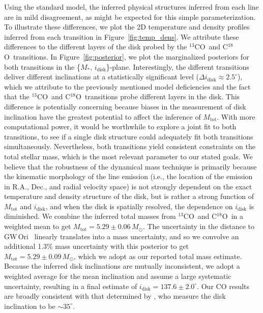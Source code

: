 \documentclass[twocolumn]{aastex61}
\newcommand{\obj}{GW\,Ori}
\newcommand{\thirteen}{${}^{13}$CO}
\newcommand{\eighteen}{C${}^{18}$O}
\begin{document}
Using the standard model, the inferred physical structures inferred from each line are in mild disagreement, as might be expected for this simple parameterization. To illustrate these differences, we plot the 2D temperature and density profiles inferred from each transition in Figure~\ref{fig:temp_dens}. We attribute these differences to the different layers of the disk probed by the \thirteen\ and \eighteen\ transitions. In Figure~\ref{fig:posterior}, we plot the marginalized posteriors for both transitions in the \{$M_\ast$, $i_\mathrm{disk}$\}-plane. Interestingly, the different transitions deliver different inclinations at a statistically significant level ($\Delta i_\mathrm{disk} \approx 2.5^\circ$), which we attribute to the previously mentioned model deficiencies and the fact that the \thirteen\ and \eighteen\ transitions probe different layers in the disk.
This difference is potentially concerning because biases in the measurement of disk inclination have the greatest potential to affect the inference of $M_\mathrm{tot}$. With more computational power, it would be worthwhile to explore a joint fit to both transitions, to see if a single disk structure could adequately fit both transitions simultaneously.
Nevertheless, both transitions yield consistent constraints on the total stellar mass, which is the most relevant parameter to our stated goals. We believe that the robustness of the dynamical mass technique is primarily because the kinematic morphology of the line emission (i.e., the location of the emission in R.A., Dec., and radial velocity space) is not strongly dependent on the exact temperature and density structure of the disk, but is rather a strong function of $M_\mathrm{tot}$ and $i_\mathrm{disk}$, and when the disk is spatially resolved, the dependence on $i_\mathrm{disk}$ is diminished. We combine the inferred total masses from \thirteen\ and \eighteen\ in a weighted mean to get $M_\mathrm{tot} = 5.29 \pm 0.06\,M_\odot$.
The uncertainty in the distance to \obj\ \citep[$388 \pm 5\,$pc;][]{kounkel17} linearly translates into a mass uncertainty, and so we convolve an additional 1.3\% mass uncertainty with this posterior to get  $M_\mathrm{tot} = 5.29 \pm 0.09\,M_\odot$, which we adopt as our reported total mass estimate. Because the inferred disk inclinations are mutually inconsistent, we adopt a weighted average for the mean inclination and assume a large systematic uncertainty, resulting in a final estimate of $i_\mathrm{disk} = 137.6 \pm 2.0^\circ$. Our CO results are broadly consistent with that determined by \citet{fang17}, who measure the disk inclination to be $\sim 35^\circ$.
\end{document}
